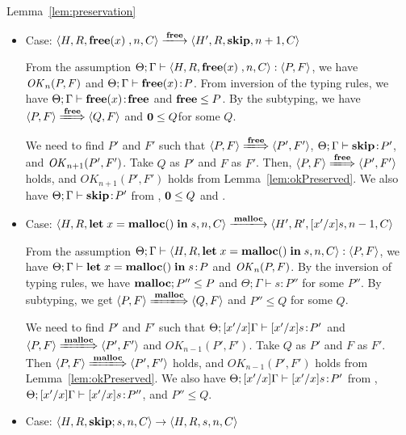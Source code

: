 \begin{pfof}{Lemma~\ref{lem:preservation}}
\begin{itemize}
\item Case: \(\langle H, R, \FREE, n, C\rangle \xlongrightarrow{\Free}
  \langle H', R, \SKIP, n + 1, C \rangle \)

  From the assumption \( \Theta; \Gamma \vdash \langle H, R, \mathbf{free}(x)\;, n,
  C \rangle : \langle P, F \rangle\), we have \(\mathit{OK}_n(P, F)\) and
  \(\Theta; \Gamma \vdash \mathbf{free}(x) \!:\! P\).  From inversion of the
  typing rules, we have \(\Theta; \Gamma \vdash \mathbf{free}(x) \!:\! \mathbf{free}\)
  and \(\mathbf{free} \le P\). By the subtyping, we have \( \langle P, F
  \rangle \xLongrightarrow{\Free} \langle Q, F \rangle\) and \(\mathbf{0}
  \le Q \)for some \(Q\).

  We need to find \(P'\) and \(F'\) such that \( \langle P, F \rangle
  \xLongrightarrow{\Free} \langle P', F' \rangle \), \(\Theta; \Gamma
  \vdash \mathbf{skip} \!:\! P'\), and \(\mathit{OK}_{n+1}(P', F')\).  Take \(Q\) as
  \(P'\) and \(F\) as \(F'\).  Then, \( \langle P, F \rangle
  \xLongrightarrow{\Free} \langle P', F' \rangle \) holds, and
  \(OK_{n+1}(P', F')\) holds from Lemma~\ref{lem:okPreserved}.  We
  also have \(\Theta; \Gamma \vdash \mathbf{skip} \!:\! P'\) from ,
  \(\mathbf{0} \le Q\) and .

\item Case: \( \langle H, R, \LET x = \MALLOC \IN s, n, C\rangle
  \xlongrightarrow{\Malloc} \langle H', R', [x'/x]s, n - 1, C \rangle \)

  From the assumption \( \Theta; \Gamma \vdash \langle H, R, \mathbf{let}\; x =
  \mathbf{malloc()}\; \mathbf{in}\; s, n, C \rangle : \langle P, F \rangle\), we have
  \(\Theta; \Gamma \vdash \mathbf{let}\; x = \mathbf{malloc()}\; \mathbf{in}\; s \!:\! P\) and
  \(\mathit{OK}_{n}(P, F)\). By the inversion of typing rules, we have
  \(\mathbf{malloc};P'' \le P\) and \(\Theta; \Gamma \vdash s : P'' \) for
  some \(P''\). By subtyping, we get \( \langle P, F \rangle
  \xLongrightarrow{\Malloc} \langle Q, F \rangle \) and \( P'' \le
  Q\) for some \(Q\).

  We need to find \(P'\) and \(F'\) such that \(\Theta; [x'/x]\Gamma
  \vdash [x'/x]s\!:\! P'\) and \( \langle P, F \rangle
  \xLongrightarrow{\Malloc} \langle P', F' \rangle\) and
  \(OK_{n-1}(P', F')\). Take \(Q\) as \(P'\) and \(F\) as \(F'\).
  Then \( \langle P, F \rangle \xLongrightarrow{\Malloc} \langle P',
  F' \rangle\) holds, and \(OK_{n-1}(P', F')\) holds from
  Lemma~\ref{lem:okPreserved}. We also have \(\Theta;[x'/x]\Gamma
  \vdash [x'/x]s \!:\! P'\) from , \(\Theta;[x'/x]\Gamma
  \vdash [x'/x]s \!:\! P''\), and \(P'' \le Q\).
      
\item Case: \( \langle H, R, \mathbf{skip};s, n, C \rangle \rightarrow \langle
  H, R, s, n, C \rangle \)


\end{itemize}
\end{pfof}
